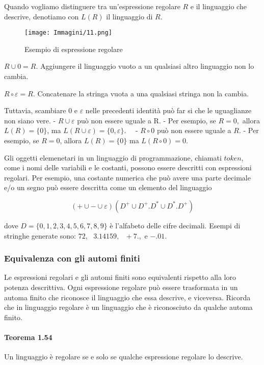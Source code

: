 \documentclass{article}
\begin{document}
Quando vogliamo distinguere tra un'espressione regolare $R$ e il linguaggio
che descrive, denotiamo con $L(R)$ il linguaggio di $R$.

\begin{figure}[H]
    \centering
    \texttt{[image: Immagini/11.png]}
    \caption{Esempio di espressione regolare}
    \label{fig:regular_expression_example1}
\end{figure}
\vspace{1em}

$R \cup 0 = R.$
Aggiungere il linguaggio vuoto a un qualsiasi altro linguaggio non lo cambia.

$R\circ \varepsilon = R$.
Concatenare la stringa vuota a una qualsiasi stringa non la cambia.

Tuttavia, scambiare $0$ e $\varepsilon$ nelle precedenti identità può far si che le uguaglianze non siano vere.
- $R \cup \varepsilon$ può non essere uguale a R.
- Per esempio, se $R = 0,$ allora $L(R) = \{0\}$, ma $L(R\cup \varepsilon) = \{0, \varepsilon\}$.
	$\text{ }$
- $R \circ 0$ può non essere uguale a $R$.
- Per esempio, se $R = 0$, allora $L(R) = \{0\}$ ma $L(R\circ 0) = 0.$

Gli oggetti elemenetari in un linguaggio di programmazione, chiamati $token$, come i nomi delle variabili e le costanti, possono essere descritti con espressioni regolari. Per esempio, una costante numerica che può avere una parte decimale e/o un segno può essere descritta come un elemento del linguaggio

$$(+ \cup - \cup \varepsilon)(D^{+}\cup D^{+}.D^{*}\cup D^{*}.D^{+})$$

dove $D = \{0,1,2,3,4,5,6,7,8,9\}$ è l'alfabeto delle cifre decimali. Esempi di stringhe generate sono: $72,\text{ }3.14159,\text{ }+7.,$ e $-.01.$

\subsubsection{Equivalenza con gli automi finiti}

Le espressioni regolari e gli automi finiti sono equivalenti rispetto alla loro potenza descrittiva. Ogni espressione regolare può essere trasformata in un automa finito che riconosce il linguaggio che essa descrive, e viceversa. Ricorda che in linguaggio regolare è un linguaggio che è riconosciuto da qualche automa finito.
\vspace{4em}

\paragraph{Teorema 1.54}
\label{teorema-1.54}
\text{  }
\begin{tcolorbox}[colback=green!10!white, colframe=green!50!black, title=Teorema 1.54]
    Un linguaggio è regolare se e solo se qualche espressione regolare lo descrive.
\end{tcolorbox}
\end{document}
